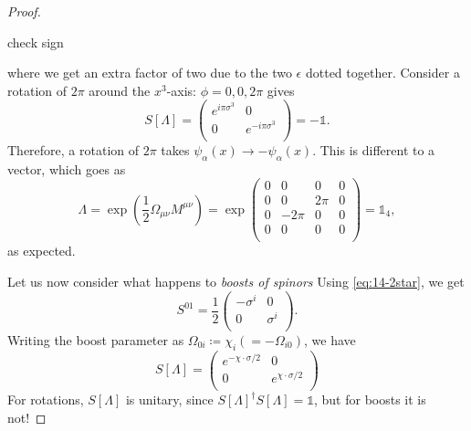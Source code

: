 \begin{proof}
\begin{leftbar}
    \begin{remark}
      check sign
    \end{remark}
  \end{leftbar}
  where we get an extra factor of two due to the two $\epsilon$ dotted together.
  Consider a rotation of $2\pi$ around the $x^3$-axis: $\phi = 0,0, 2 \pi$ gives
  \begin{equation}
    S[\Lambda] = 
    \begin{pmatrix}
      e^{i\pi \sigma^3} & 0 \\
      0 & e^{-i\pi \sigma^3} \\
    \end{pmatrix}
    = -\mathbb{1}.
  \end{equation}
  Therefore, a rotation of $2\pi$ takes $\psi_\alpha(x) \to -\psi_{\alpha}(x)$. This is different to a vector, which goes as 
  \begin{equation}
    \Lambda = \exp(\frac{1}{2} \Omega_{\mu\nu} M^{\mu\nu}) = \exp
    \begin{pmatrix}
     0 & 0 & 0 & 0 \\
     0 & 0 & 2\pi & 0 \\
     0 & -2\pi & 0 & 0 \\
     0 & 0 & 0 & 0 \\
    \end{pmatrix} = \mathbb{1}_4,
  \end{equation}
  as expected.

  Let us now consider what happens to \emph{boosts of spinors}
  Using \eqref{eq:14-2star}, we get
  \begin{equation}
    S^{01} = \frac{1}{2} 
    \begin{pmatrix}
     -\sigma^i & 0 \\
     0 & \sigma^i \\
    \end{pmatrix}.
  \end{equation}
  Writing the boost parameter as $\Omega_{0i} \coloneqq \chi_i (=- \Omega_{i0})$, we have
  \begin{equation}
    S[\Lambda] = 
    \begin{pmatrix}
     e^{-\chi \cdot \sigma / 2} & 0 \\
     0 & e^{\chi \cdot \sigma/2} \\
    \end{pmatrix}
  \end{equation}
  For rotations, $S[\Lambda]$ is unitary, since $S[\Lambda]^{\dagger} S[\Lambda] = \mathbb{1}$, but for boosts it is not!
\end{proof}
